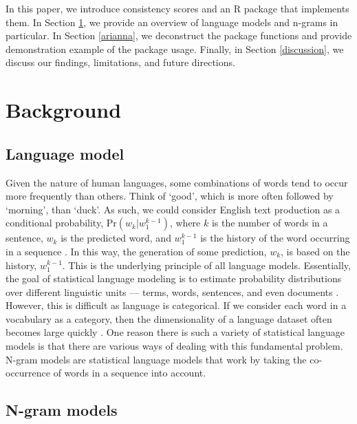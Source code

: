 \documentclass[11pt,]{article}
\begin{document}
In this paper, we introduce consistency scores and an R package that implements them. In Section \ref{background}, we provide an overview of language models and n-grams in particular. In Section \ref{arianna}, we deconstruct the package functions and provide demonstration example of the package usage. Finally, in Section \ref{discussion}, we discuss our findings, limitations, and future directions.

\hypertarget{background}{%
\section{Background}\label{background}}

\hypertarget{language-model}{%
\subsection{Language model}\label{language-model}}

Given the nature of human languages, some combinations of words tend to occur more frequently than others. Think of `good', which is more often followed by `morning', than `duck'. As such, we could consider English text production as a conditional probability, \(\mbox{Pr}(w_{k} | w^{k-1}_{1})\), where \(k\) is the number of words in a sentence, \(w_{k}\) is the predicted word, and \(w^{k-1}_{1}\) is the history of the word occurring in a sequence \citep{brown1992class}. In this way, the generation of some prediction, \(w_{k}\), is based on the history, \(w^{k-1}_{1}\). This is the underlying principle of all language models. Essentially, the goal of statistical language modeling is to estimate probability distributions over different linguistic units --- terms, words, sentences, and even documents \citep{bengio2003neural}. However, this is difficult as language is categorical. If we consider each word in a vocabulary as a category, then the dimensionality of a language dataset often becomes large quickly \citep{rosenfeld2000two}. One reason there is such a variety of statistical language models is that there are various ways of dealing with this fundamental problem. N-gram models are statistical language models that work by taking the co-occurrence of words in a sequence into account.

\hypertarget{n-gram-models}{%
\subsection{N-gram models}\label{n-gram-models}}
\end{document}
